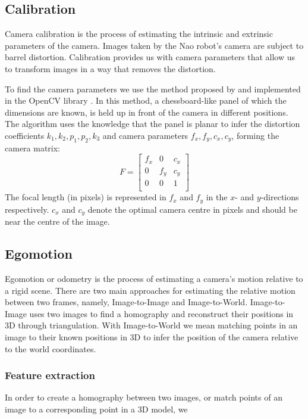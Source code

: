 \documentclass[a4paper]{article}
\begin{document}
\subsection{Calibration}
Camera calibration is the process of estimating the intrinsic and extrinsic
parameters of the camera. Images taken by the Nao robot's camera are subject to
barrel distortion. Calibration provides us with camera parameters that allow us
to transform images in a way that removes the distortion.
\par
To find the camera parameters we use the method proposed by
\cite{zhang1999flexible} and implemented in the OpenCV library
\citep{opencv_library}. In this method, a chessboard-like panel of which the
dimensions are known, is held up in front of the camera in different positions.
The algorithm uses the knowledge that the panel is planar to infer the
distortion coefficients $k_1, k_2, p_1, p_2, k_3$ and camera parameters $f_x,
f_y, c_x, c_y$, forming the camera matrix:
$$
F =
\begin{bmatrix}
	f_x	& 0		& c_x\\
	0		& f_y		& c_y\\
	0		& 0		& 1\\
\end{bmatrix}
$$
The focal length (in pixels) is represented in $f_x$ and $f_y$ in the $x$- and
$y$-directions respectively. $c_x$ and $c_y$ denote the optimal camera centre
in pixels and should be near the centre of the image.


\subsection{Egomotion}
Egomotion or odometry is the process of estimating a camera's motion relative
to a rigid scene. There are two main approaches for estimating the relative
motion between two frames, namely, Image-to-Image and Image-to-World.
Image-to-Image uses two images to find a homography and reconstruct their
positions in 3D through triangulation. With Image-to-World we mean matching
points in an image to their known positions in 3D to infer the position of the
camera relative to the world coordinates.


\subsubsection{Feature extraction}
In order to create a homography between two images, or match points of an image
to a corresponding point in a 3D model, we 
\end{document}
